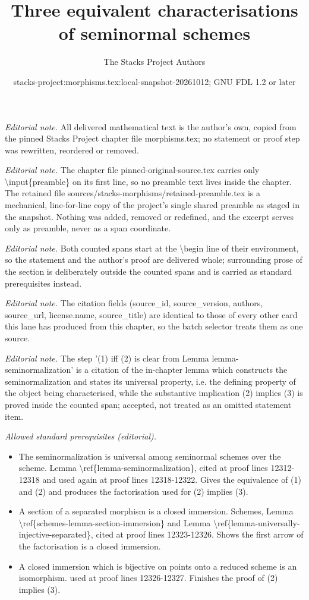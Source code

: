 \documentclass[10pt,a4paper]{amsart}
\title{Three equivalent characterisations of seminormal schemes}
\author{The Stacks Project Authors}
\date{stacks-project:morphisms.tex:local-snapshot-20261012; GNU FDL 1.2 or later}
\theoremstyle{plain}
\theoremstyle{definition}
\theoremstyle{remark}
\numberwithin{equation}{subsection}
\begin{document}
\maketitle
\setcounter{subsection}{1}
\noindent\textit{Editorial note.} All delivered mathematical text is the author's own, copied from the pinned Stacks Project chapter file morphisms.tex; no statement or proof step was rewritten, reordered or removed.\par\medskip
\noindent\textit{Editorial note.} The chapter file pinned-original-source.tex carries only \textbackslash{}input\{preamble\} on its first line, so no preamble text lives inside the chapter. The retained file sources/stacks-morphisms/retained-preamble.tex is a mechanical, line-for-line copy of the project's single shared preamble as staged in the snapshot. Nothing was added, removed or redefined, and the excerpt serves only as preamble, never as a span coordinate.\par\medskip
\noindent\textit{Editorial note.} Both counted spans start at the \textbackslash{}begin line of their environment, so the statement and the author's proof are delivered whole; surrounding prose of the section is deliberately outside the counted spans and is carried as standard prerequisites instead.\par\medskip
\noindent\textit{Editorial note.} The citation fields (source\_id, source\_version, authors, source\_url, license.name, source\_title) are identical to those of every other card this lane has produced from this chapter, so the batch selector treats them as one source.\par\medskip
\noindent\textit{Editorial note.} The step '(1) iff (2) is clear from Lemma lemma-seminormalization' is a citation of the in-chapter lemma which constructs the seminormalization and states its universal property, i.e. the defining property of the object being characterised, while the substantive implication (2) implies (3) is proved inside the counted span; accepted, not treated as an omitted statement item.\par\medskip
\noindent\textit{Allowed standard prerequisites (editorial).}\begin{itemize}
\item The seminormalization is universal among seminormal schemes over the scheme. Lemma \textbackslash{}ref\{lemma-seminormalization\}, cited at proof lines 12312-12318 and used again at proof lines 12318-12322. Gives the equivalence of (1) and (2) and produces the factorisation used for (2) implies (3).
\item A section of a separated morphism is a closed immersion. Schemes, Lemma \textbackslash{}ref\{schemes-lemma-section-immersion\} and Lemma \textbackslash{}ref\{lemma-universally-injective-separated\}, cited at proof lines 12323-12326. Shows the first arrow of the factorisation is a closed immersion.
\item A closed immersion which is bijective on points onto a reduced scheme is an isomorphism. used at proof lines 12326-12327. Finishes the proof of (2) implies (3).
\end{itemize}\medskip
\end{document}
